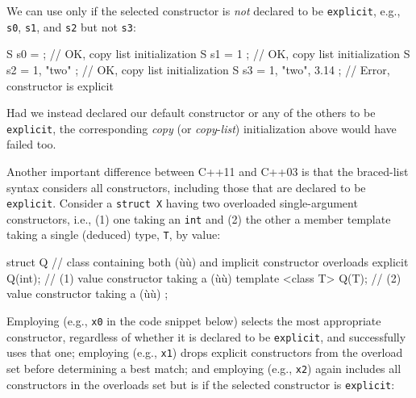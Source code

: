 \noindent We can use  only if the selected
constructor is \emph{not} declared to be \lstinline!explicit!, e.g.,
\lstinline!s0!, \lstinline!s1!, and \lstinline!s2! but not \lstinline!s3!:

\begin{emcppslisting}
S s0 = { };                 // OK, copy list initialization
S s1 = { 1 };               // OK, copy list initialization
S s2 = { 1, "two" };        // OK, copy list initialization
S s3 = { 1, "two", 3.14 };  // Error, constructor is explicit
\end{emcppslisting}


\noindent Had we instead declared our default constructor or any of the others to
be \lstinline!explicit!, the corresponding \emph{copy} (or
\emph{copy}-\emph{list}) initialization above would have failed too.

Another important difference between C++11  and C++03  is that the
braced-list syntax considers all constructors, including those that are
declared to be \lstinline!explicit!. Consider a \lstinline!struct!~\lstinline!X!
having two overloaded single-argument constructors, i.e., (1) one taking
an \lstinline!int! and (2) the other a member template taking a single
(deduced) type, \lstinline!T!, by value:

\begin{emcppslisting}
struct Q  // class containing both (ù{}ù) and implicit constructor overloads
{
    explicit Q(int);          // (1) value constructor taking a (ù{}ù)
    template <class T> Q(T);  // (2) value constructor taking a (ù{}ù)
};
\end{emcppslisting}


\noindent Employing  (e.g., \lstinline!x0! in
the code snippet below) selects the most appropriate constructor,
regardless of whether it is declared to be \lstinline!explicit!, and
successfully uses that one; employing  (e.g., \lstinline!x1!) drops explicit constructors from the
overload set before determining a best match; and employing  (e.g., \lstinline!x2!) again includes all
constructors in the overloads set but is  if the
selected constructor is \lstinline!explicit!:

